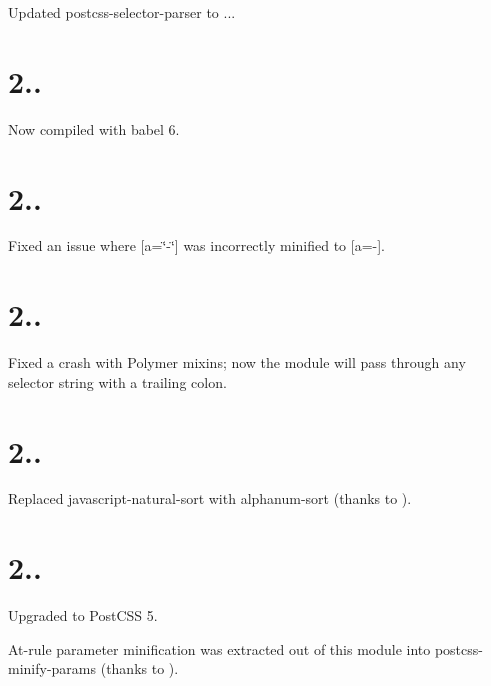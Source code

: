 \begin{DoxyItemize}
\item Updated postcss-\/selector-\/parser to {..}.
\end{DoxyItemize}

\section*{2..}


\begin{DoxyItemize}
\item Now compiled with babel 6.
\end{DoxyItemize}

\section*{2..}


\begin{DoxyItemize}
\item Fixed an issue where {\ttfamily \mbox{[}a=\char`\"{}-\/\char`\"{}\mbox{]}} was incorrectly minified to {\ttfamily \mbox{[}a=-\/\mbox{]}}.
\end{DoxyItemize}

\section*{2..}


\begin{DoxyItemize}
\item Fixed a crash with Polymer mixins; now the module will pass through any selector string with a trailing colon.
\end{DoxyItemize}

\section*{2..}


\begin{DoxyItemize}
\item Replaced javascript-\/natural-\/sort with alphanum-\/sort (thanks to ).
\end{DoxyItemize}

\section*{2..}


\begin{DoxyItemize}
\item Upgraded to Post\+C\+SS 5.
\item At-\/rule parameter minification was extracted out of this module into postcss-\/minify-\/params (thanks to ).
\end{DoxyItemize}

